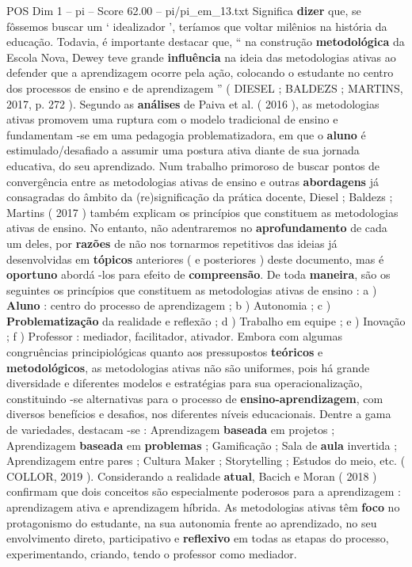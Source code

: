 \begin{textsample}{POS Dim 1 – pi – Score 62.00 – pi/pi\_em\_13.txt}
Significa \textbf{dizer} que, se fôssemos buscar um ‘ idealizador ’, teríamos que voltar milênios na história da educação.
Todavia, é importante destacar que, “ na construção \textbf{metodológica} da Escola Nova, Dewey teve grande \textbf{influência} na ideia das metodologias ativas ao defender que a aprendizagem ocorre pela ação, colocando o estudante no centro dos processos de ensino e de aprendizagem ” ( DIESEL ; BALDEZS ; MARTINS, 2017, p. 272 ).
Segundo as \textbf{análises} de Paiva et al. ( 2016 ), as metodologias ativas promovem uma ruptura com o modelo tradicional de ensino e fundamentam -se em uma pedagogia problematizadora, em que o \textbf{aluno} é estimulado/desafiado a assumir uma postura ativa diante de sua jornada educativa, do seu aprendizado.
Num trabalho primoroso de buscar pontos de convergência entre as metodologias ativas de ensino e outras \textbf{abordagens} já consagradas do âmbito da (re)significação da prática docente, Diesel ; Baldezs ; Martins ( 2017 ) também explicam os princípios que constituem as metodologias ativas de ensino.
No entanto, não adentraremos no \textbf{aprofundamento} de cada um deles, por \textbf{razões} de não nos tornarmos repetitivos das ideias já desenvolvidas em \textbf{tópicos} anteriores ( e posteriores ) deste documento, mas é \textbf{oportuno} abordá -los para efeito de \textbf{compreensão}.
De toda \textbf{maneira}, são os seguintes os princípios que constituem as metodologias ativas de ensino : a ) \textbf{Aluno} : centro do processo de aprendizagem ; b ) Autonomia ; c ) \textbf{Problematização} da realidade e reflexão ; d ) Trabalho em equipe ; e ) Inovação ; f ) Professor : mediador, facilitador, ativador.
Embora com algumas congruências principiológicas quanto aos pressupostos \textbf{teóricos} e \textbf{metodológicos}, as metodologias ativas não são uniformes, pois há grande diversidade e diferentes modelos e estratégias para sua operacionalização, constituindo -se alternativas para o processo de \textbf{ensino-aprendizagem}, com diversos benefícios e desafios, nos diferentes níveis educacionais.
Dentre a gama de variedades, destacam -se : Aprendizagem \textbf{baseada} em projetos ; Aprendizagem \textbf{baseada} em \textbf{problemas} ; Gamificação ; Sala de \textbf{aula} invertida ; Aprendizagem entre pares ; Cultura Maker ; Storytelling ; Estudos do meio, etc. ( COLLOR, 2019 ).
Considerando a realidade \textbf{atual}, Bacich e Moran ( 2018 ) confirmam que dois conceitos são especialmente poderosos para a aprendizagem : aprendizagem ativa e aprendizagem híbrida.
As metodologias ativas têm \textbf{foco} no protagonismo do estudante, na sua autonomia frente ao aprendizado, no seu envolvimento direto, participativo e \textbf{reflexivo} em todas as etapas do processo, experimentando, criando, tendo o professor como mediador.

\end{textsample}
